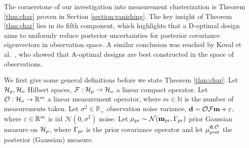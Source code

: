\begin{enumerate}




\end{enumerate}

The cornerstone of our investigation into measurement clusterization
is Theorem \ref{thm:char} proven in Section
\ref{section:vanishing}. The key insight of Theorem \ref{thm:char}
lies in its fifth component, which highlights that a D-optimal design
aims to uniformly reduce posterior uncertainties for posterior
covariance eigenvectors in observation space. A similar conclusion was
reached by Koval et al.~\cite{koval2020}, who showed that A-optimal
designs are best constructed in the space of observations.

We first give some general definitions before we state Theorem
\ref{thm:char}: Let $\mathcal{H}_p, \mathcal{H}_o$ Hilbert spaces, $\mathcal{F}:\mathcal{H}_p \to
\mathcal{H}_o$ a linear compact operator. Let $\mathcal{O}: \mathcal{H}_o \to \mathbb{R}^m$ a
linear measurement operator, where $m \in \mathbb{N}$ is the number of
measurements taken. Let $\sigma^2 \in \mathbb{R}_{+}$ observation
noise variance, $\mathbf{d} = \mathcal{O} \mathcal{F} \mathbf{m} + \varepsilon$, where $\varepsilon \in
\mathbb{R}^m$ is iid $\mathcal{N}(0, \sigma^2)$ noise. Let $\mu_{\textup{pr}} \sim
\mathcal{N}(\mathbf{m}_{\textup{pr}}, \Gamma_{\textup{pr}})$ prior Gaussian measure on $\mathcal{H}_p$, where
$\Gamma_{\textup{pr}}$ is the prior covariance operator and let $\mu_{\textup{post}}^{\mathbf{d}, \mathcal{O}}$ the
posterior (Gaussian) measure.
  
